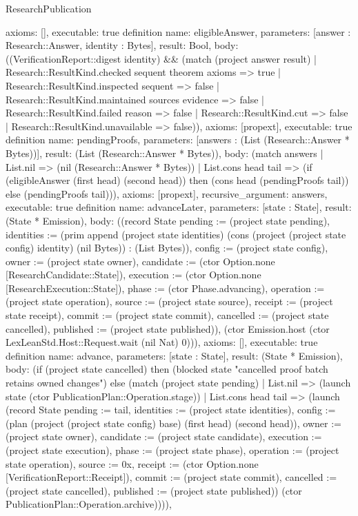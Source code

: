 \begin{lexlean}{ResearchPublication}
\begin{semanticmodule}
{ axioms: [],
 executable: true
}
definition{
 name: eligibleAnswer,
 parameters: [answer : Research::Answer, identity : Bytes],
 result: Bool,
 body: ((VerificationReport::digest identity) && (match (project answer result) | Research::ResultKind.checked sequent theorem axioms => true | Research::ResultKind.inspected sequent => false | Research::ResultKind.maintained sources evidence => false | Research::ResultKind.failed reason => false | Research::ResultKind.cut => false | Research::ResultKind.unavailable => false)),
 axioms: [propext],
 executable: true
}
definition{
 name: pendingProofs,
 parameters: [answers : (List (Research::Answer * Bytes))],
 result: (List (Research::Answer * Bytes)),
 body: (match answers | List.nil => (nil (Research::Answer * Bytes)) | List.cons head tail => (if (eligibleAnswer (first head) (second head)) then (cons head (pendingProofs tail)) else (pendingProofs tail))),
 axioms: [propext],
 recursive_argument: answers,
 executable: true
}
definition{
 name: advanceLater,
 parameters: [state : State],
 result: (State * Emission),
 body: ((record State {pending := (project state pending), identities := (prim append (project state identities) (cons (project (project state config) identity) (nil Bytes)) : (List Bytes)), config := (project state config), owner := (project state owner), candidate := (ctor Option.none [ResearchCandidate::State]), execution := (ctor Option.none [ResearchExecution::State]), phase := (ctor Phase.advancing), operation := (project state operation), source := (project state source), receipt := (project state receipt), commit := (project state commit), cancelled := (project state cancelled), published := (project state published)}), (ctor Emission.host (ctor LexLeanStd.Host::Request.wait (nil Nat) 0))),
 axioms: [],
 executable: true
}
definition{
 name: advance,
 parameters: [state : State],
 result: (State * Emission),
 body: (if (project state cancelled) then (blocked state "cancelled proof batch retains owned changes") else (match (project state pending) | List.nil => (launch state (ctor PublicationPlan::Operation.stage)) | List.cons head tail => (launch (record State {pending := tail, identities := (project state identities), config := (plan (project (project state config) base) (first head) (second head)), owner := (project state owner), candidate := (project state candidate), execution := (project state execution), phase := (project state phase), operation := (project state operation), source := 0x, receipt := (ctor Option.none [VerificationReport::Receipt]), commit := (project state commit), cancelled := (project state cancelled), published := (project state published)}) (ctor PublicationPlan::Operation.archive)))),
}
\end{semanticmodule}
\end{lexlean}
